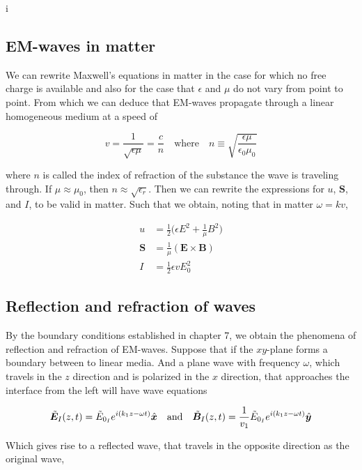 i\documentclass[a4paper]{article}
\begin{document}
\subsection{EM-waves in matter}

We can rewrite Maxwell's equations in matter in the case for which no free charge is available and also for the case that $\epsilon$ and $\mu$ do not vary from point to point. From which we can deduce that EM-waves propagate through a linear homogeneous medium at a speed of

\begin{equation*}
    v=\frac{1}{\sqrt{\epsilon\mu}}=\frac{c}{n}\quad\text{where}\quad n\equiv\sqrt{\frac{\epsilon\mu}{\epsilon_0\mu_0}}
\end{equation*}

where $n$ is called the index of refraction of the substance the wave is traveling through. If $\mu\approx\mu_0$, then $n\approx\sqrt{\epsilon_r}$. Then we can rewrite the expressions for $u$, $\bm{S}$, and $I$, to be valid in matter. Such that we obtain, noting that in matter $\omega=kv$,

\begin{align*}
    u&=\frac{1}{2}\bigg(\epsilon E^2+\frac{1}{\mu}B^2\bigg)\\[1em]
    \bm{S}&=\frac{1}{\mu}(\bm{E}\times\bm{B})\\[1em]
    I&=\frac{1}{2}\epsilon vE_0^2
\end{align*}

\subsection{Reflection and refraction of waves}

By the boundary conditions established in chapter 7, we obtain the phenomena of reflection and refraction of EM-waves. Suppose that if the $xy$-plane forms a boundary between to linear media. And a plane wave with frequency $\omega$, which travels in the $z$ direction and is polarized in the $x$ direction, that approaches the interface from the left will have wave equations

\begin{align*}
    \Tilde{\bm{E}}_I(z, t) = \Tilde{E}_{0_{I}}e^{i(k_1z-\omega t)}\hat{\bm{x}}\quad\text{and}\quad
    \Tilde{\bm{B}}_I(z, t) = \frac{1}{v_1}\Tilde{E}_{0_{I}}e^{i(k_1z-\omega t)}\hat{\bm{y}}
\end{align*}

Which gives rise to a reflected wave, that travels in the opposite direction as the original wave, 
\end{document}
